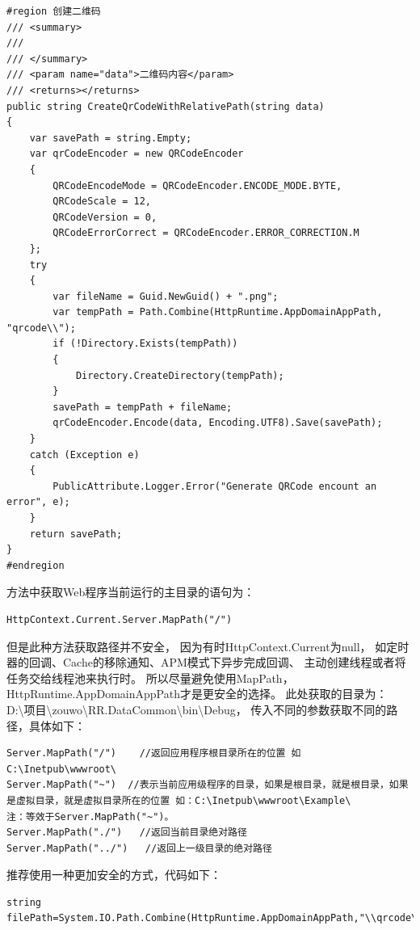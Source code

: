 \documentclass{book}
\begin{document}
\begin{lstlisting}[language={[Sharp]C},caption=生成二维码]
#region 创建二维码
/// <summary>
/// 
/// </summary>
/// <param name="data">二维码内容</param>
/// <returns></returns>
public string CreateQrCodeWithRelativePath(string data)
{
    var savePath = string.Empty;
    var qrCodeEncoder = new QRCodeEncoder
    {
        QRCodeEncodeMode = QRCodeEncoder.ENCODE_MODE.BYTE,
        QRCodeScale = 12,
        QRCodeVersion = 0,
        QRCodeErrorCorrect = QRCodeEncoder.ERROR_CORRECTION.M
    };
    try
    {
        var fileName = Guid.NewGuid() + ".png";
        var tempPath = Path.Combine(HttpRuntime.AppDomainAppPath, "qrcode\\");
        if (!Directory.Exists(tempPath))
        {
            Directory.CreateDirectory(tempPath);
        }
        savePath = tempPath + fileName;
        qrCodeEncoder.Encode(data, Encoding.UTF8).Save(savePath);
    }
    catch (Exception e)
    {
        PublicAttribute.Logger.Error("Generate QRCode encount an error", e);
    }
    return savePath;
}
#endregion
\end{lstlisting}

方法中获取Web程序当前运行的主目录的语句为：

\begin{lstlisting}
HttpContext.Current.Server.MapPath("/")
\end{lstlisting}

但是此种方法获取路径并不安全，
因为有时HttpContext.Current为null，
如定时器的回调、Cache的移除通知、APM模式下异步完成回调、
主动创建线程或者将任务交给线程池来执行时。
所以尽量避免使用MapPath，HttpRuntime.AppDomainAppPath才是更安全的选择。
此处获取的目录为：D:\textbackslash 项目\textbackslash zouwo\textbackslash RR.DataCommon\textbackslash bin\textbackslash Debug，
传入不同的参数获取不同的路径，具体如下：

\begin{lstlisting}
Server.MapPath("/")    //返回应用程序根目录所在的位置 如 C:\Inetpub\wwwroot\
Server.MapPath("~")  //表示当前应用级程序的目录，如果是根目录，就是根目录，如果是虚拟目录，就是虚拟目录所在的位置 如：C:\Inetpub\wwwroot\Example\
注：等效于Server.MapPath("~")。
Server.MapPath("./")   //返回当前目录绝对路径
Server.MapPath("../")   //返回上一级目录的绝对路径
\end{lstlisting}

推荐使用一种更加安全的方式，代码如下：

\begin{lstlisting}[language={[Sharp]C}]
string filePath=System.IO.Path.Combine(HttpRuntime.AppDomainAppPath,"\\qrcode\\a.png");
\end{lstlisting}
\end{document}
